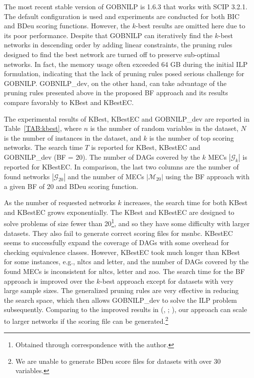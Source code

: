 \documentclass[letterpaper]{article}
\newcommand{\graphset}{\mathcal{G}}
\newcommand{\gobnilp}{GOBNILP}
\begin{document}
The most recent stable version of \gobnilp{} is 1.6.3 that works with SCIP 3.2.1. The default configuration is used and experiments are conducted for both BIC and BDeu scoring functions. However, the $k$-best results are omitted here due to its poor performance. Despite that \gobnilp{} can iteratively find the $k$-best networks in descending order by adding linear constraints, the pruning rules designed to find the best network are turned off to preserve sub-optimal networks. In fact, the memory usage often exceeded 64 GB during the initial ILP formulation, indicating that the lack of pruning rules posed serious challenge for GOBNILP. \gobnilp{\_dev}, on the other hand, can take advantage of the pruning rules presented above in the proposed BF approach and its results compare favorably to KBest and KBestEC.

The experimental results of KBest, KBestEC and \gobnilp{\_dev} are reported in Table~\ref{TAB:kbest}, where $n$ is the number of random variables in the dataset, $N$ is the number of instances in the dataset, and $k$ is the number of top scoring networks. The search time $T$ is reported for KBest, KBestEC and GOBNILP\_dev (BF = 20). The number of DAGs covered by the $k$ MECs $|\graphset_k|$ is reported for KBestEC. In comparison, the last two columns are the number of found networks $|\graphset_{20}|$ and the number of MECs $|\mathcal{M}_{20}|$ using the BF approach with a given BF of 20 and BDeu scoring function.

As the number of requested networks $k$ increases, the search time for both KBest and KBestEC grows exponentially. The KBest and KBestEC are designed to solve problems of size fewer than 20\footnote{Obtained through correspondence with the author.}, and so they have some difficulty with larger datasets. They also fail to generate correct scoring files for msnbc. KBestEC seems to successfully expand the coverage of DAGs with some overhead for checking equivalence classes. However, KBestEC took much longer than KBest for some instances, e.g., nltcs and letter, and the number of DAGs covered by the found MECs is inconsistent for nltcs, letter and zoo. The search time for the BF approach is improved over the $k$-best approach except for datasets with very large sample sizes. The generalized pruning rules are very effective in reducing the search space, which then allows GOBNILP\_dev to solve the ILP problem subsequently. Comparing to the improved results in (\citeauthor{ChenCD2015}, \citeyear{ChenCD2015}; \citeyear{ChenCD2016}), our approach can scale to larger networks if the scoring file can be generated.\footnote{We are unable to generate BDeu score files for datasets with over 30 variables.}
\end{document}
